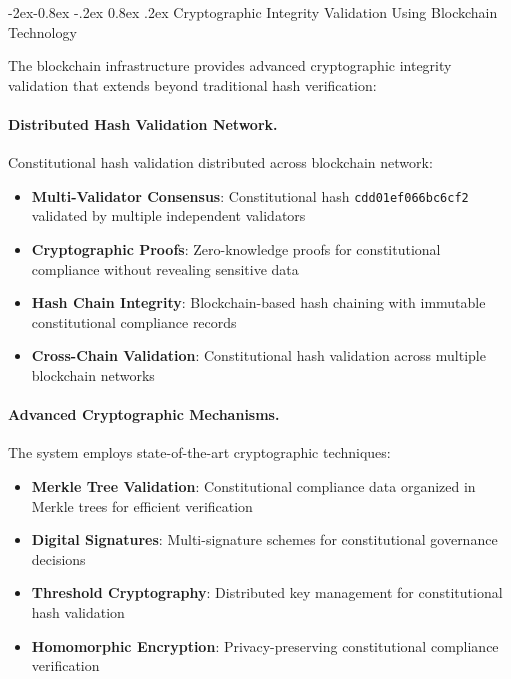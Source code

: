 \documentclass[manuscript,screen,9pt]{acmart}
\makeatletter
\renewcommand\subsubsection{\@startsection{subsubsection}{3}{\z@}%
  {-2ex\@plus -0.8ex \@minus -.2ex}%
  {0.8ex \@plus .2ex}%
  {\normalfont\normalsize\bfseries}}
\makeatother
\begin{document}
\subsubsection{Cryptographic Integrity Validation Using Blockchain Technology}
\label{subsubsec:cryptographic_blockchain_validation}

The blockchain infrastructure provides advanced cryptographic integrity validation that extends beyond traditional hash verification:

\paragraph{Distributed Hash Validation Network.} Constitutional hash validation distributed across blockchain network:
\begin{itemize}[itemsep=1pt,parsep=1pt]
    \item \textbf{Multi-Validator Consensus}: Constitutional hash \texttt{cdd01ef066bc6cf2} validated by multiple independent validators
    \item \textbf{Cryptographic Proofs}: Zero-knowledge proofs for constitutional compliance without revealing sensitive data
    \item \textbf{Hash Chain Integrity}: Blockchain-based hash chaining with immutable constitutional compliance records
    \item \textbf{Cross-Chain Validation}: Constitutional hash validation across multiple blockchain networks
\end{itemize}

\paragraph{Advanced Cryptographic Mechanisms.} The system employs state-of-the-art cryptographic techniques:
\begin{itemize}[itemsep=1pt,parsep=1pt]
    \item \textbf{Merkle Tree Validation}: Constitutional compliance data organized in Merkle trees for efficient verification
    \item \textbf{Digital Signatures}: Multi-signature schemes for constitutional governance decisions
    \item \textbf{Threshold Cryptography}: Distributed key management for constitutional hash validation
    \item \textbf{Homomorphic Encryption}: Privacy-preserving constitutional compliance verification
\end{itemize}
\end{document}
